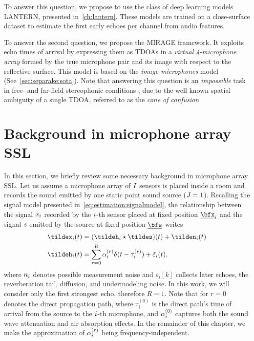 To answer this question, we propose to use the class of deep learning models \acs{LANTERN}, presented in~\cref{ch:lantern}.
These models are trained on a close-surface dataset to estimate the first early echoes per channel from audio features.

To answer the second question, we propose the \acf{MIRAGE} framework.
It exploits echo times of arrival by expressing them as \acp{TDOA} in a \textit{virtual 4-microphone array} formed by the true microphone pair and its image with respect to the reflective surface.
This model is based on the \textit{image microphones} model (See~\cref{sec:separake:sota}).
Note that answering this question is an \textit{impossible} task in free- and far-field stereophonic conditions , due to the well known spatial ambiguity of a single \ac{TDOA}, referred to as the \textit{cone of confusion}~

\section{Background in microphone array SSL}\label{sec:background}
In this section, we briefly review some necessary background in microphone array \ac{SSL}.
Let us assume a microphone array of $I$ sensors is placed inside a room and records the sound emitted by one static point sound source ($J=1$).
Recalling the signal model presented in~\cref{eq:estimation:signalmodel}, the relationship between the signal $x_{i}$ recorded by the $i$-th sensor placed at fixed position $\positionMicrophone_\idxMic$ and the signal $s$ emitted by the source at fixed position $\positionSource$ writes
\begin{equation}\label{eq:mirage:signalmodel}
    \begin{aligned}
        \tildex_i(t) &= (\tildeh_i \convCont \tildes)(t) + \tilden_i(t)\\
        \tildeh_i(t) &= \echoModelTimeSimple{i} + \tilde{\varepsilon}_i(t),
    \end{aligned}
\end{equation}
where $n_{i}$ denotes possible measurement noise and $\varepsilon_i[k]$ collects later echoes, the reverberation tail, diffusion, and undermodeling noise.
In this work, we will consider only the first strongest echo, therefore $R = 1$.
Note that for $r=0$ denotes the direct propagation path, where $\tau_i^(0)$ is the direct path's time of arrival from the source to the $i$-th microphone, and $\alpha^{(0)}_{i}$ captures both the sound wave attenuation and air absorption effects.
In the remainder of this chapter, we make the approximation of $\alpha_i^{(r)}$ being frequency-independent.

